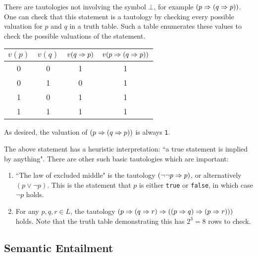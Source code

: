 \documentclass{article}
\begin{document}
\begin{note}
	There are tautologies not involving the symbol $\bot$, for example $(p \Rightarrow (q \Rightarrow p))$. One can check that this statement is a tautology by checking every possible valuation for $p$ and $q$ in a truth table. Such a table enumerates these values to check the possible valuations of the statement.
\end{note}

\renewcommand{\arraystretch}{1.3}

\begin{table}[h!]
\small{
\begin{center}

\begin{tabular}{|c|c|c|c|}
\hline
$v(p)$ & $v(q)$ & $v(q \Rightarrow p)$ & $v(p \Rightarrow (q \Rightarrow p))$ \\ \hline
0 & 0 & 1 & 1 \\ \hline
0 & 1 & 0 & 1 \\ \hline
1 & 0 & 1 & 1 \\ \hline
1 & 1 & 1 & 1 \\ \hline
\end{tabular}
\end{center}
}
\end{table}
As desired, the valuation of $(p \Rightarrow (q \Rightarrow p))$ is always \texttt{1}.

\begin{example}
    The above statement has a heuristic interpretation: ``a true statement is implied by anything". There are other such basic tautologies which are important:
    \begin{enumerate}
    	\item ``The law of excluded middle" is the tautology $(\lnot \lnot p \Rightarrow p)$, or alternatively $(p \lor \lnot p)$. This is the statement that $p$ is either \texttt{true} or \texttt{false}, in which case $\lnot p$ holds.
    	\item For any $p, q, r \in L$, the tautology $(p \Rightarrow (q \Rightarrow r) \Rightarrow ((p \Rightarrow q) \Rightarrow (p \Rightarrow r)))$ holds. Note that the truth table demonstrating this has $2^3 = 8$ rows to check.
	\end{enumerate}
\end{example}


\subsection{Semantic Entailment}
\label{section-propositional-logic-semantic-entailment}
\end{document}
